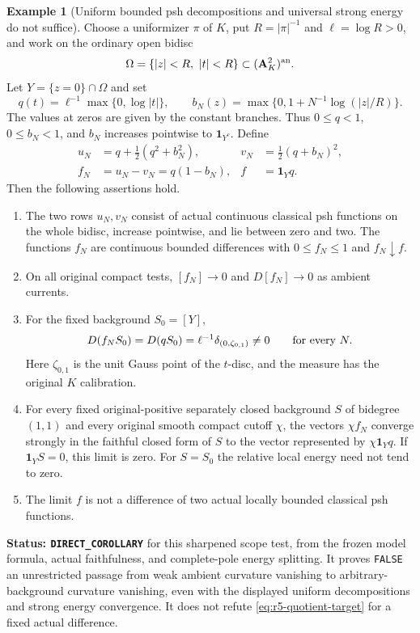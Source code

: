 \documentclass[11pt,a4paper]{article}
\numberwithin{equation}{section}
\theoremstyle{definition}
\newtheorem{example}[theorem]{Example}
\theoremstyle{remark}
\begin{document}
\begin{example}[Uniform bounded psh decompositions and universal strong energy do not suffice]
\label{ex:r5-universal-energy-polar-obstruction}
Choose a uniformizer $\pi$ of $K$, put $R=|\pi|^{-1}$ and
$\ell=\log R>0$, and work on the ordinary open bidisc
\[
 \Omega=\{|z|<R,\ |t|<R\}\subset(\mathbf A_K^2)^{\rm an}.
\]
Let $Y=\{z=0\}\cap\Omega$ and set
\[
 q(t)=\ell^{-1}\max\{0,\log|t|\},\qquad
 b_N(z)=\max\{0,1+N^{-1}\log(|z|/R)\}.
\]
The values at zeros are given by the constant branches. Thus
$0\leq q<1$, $0\leq b_N<1$, and $b_N$ increases pointwise to
$\mathbf1_{Y^c}$. Define
\begin{align*}
 u_N&=q+\tfrac12(q^2+b_N^2),&
 v_N&=\tfrac12(q+b_N)^2,\\
 f_N&=u_N-v_N=q(1-b_N),&
 f&=\mathbf1_Yq.
\end{align*}
Then the following assertions hold.
\begin{enumerate}
\item The two rows $u_N,v_N$ consist of actual continuous
classical psh functions on the whole bidisc, increase pointwise,
and lie between zero and two. The functions $f_N$ are continuous
bounded differences with $0\leq f_N\leq1$ and $f_N\downarrow f$.
\item On all original compact tests, $[f_N]\to0$ and
$D[f_N]\to0$ as ambient currents.
\item For the fixed background $S_0=[Y]$,
\[
 D(f_NS_0)=D(qS_0)
      =\ell^{-1}\delta_{(0,\zeta_{0,1})}\ne0
       \qquad\hbox{for every }N.
\]
Here $\zeta_{0,1}$ is the unit Gauss point of the $t$-disc,
and the measure has the original $K$ calibration.
\item For every fixed original-positive separately closed
background $S$ of bidegree $(1,1)$ and every original smooth
compact cutoff $\chi$, the vectors $\chi f_N$ converge strongly
in the faithful closed form of $S$ to the vector represented by
$\chi\mathbf1_Yq$. If $\mathbf1_YS=0$, this limit is zero.
For $S=S_0$ the relative local energy need not tend to zero.
\item The limit $f$ is not a difference of two actual locally
bounded classical psh functions.
\end{enumerate}
\end{example}

\noindent\textbf{Status: \texttt{DIRECT\_COROLLARY}} for this
sharpened scope test, from the frozen model formula, actual
faithfulness, and complete-pole energy splitting. It proves
\texttt{FALSE} an unrestricted passage from weak ambient
curvature vanishing to arbitrary-background curvature vanishing,
even with the displayed uniform decompositions and strong energy
convergence. It does not refute
\eqref{eq:r5-quotient-target} for a fixed actual difference.
\end{document}
